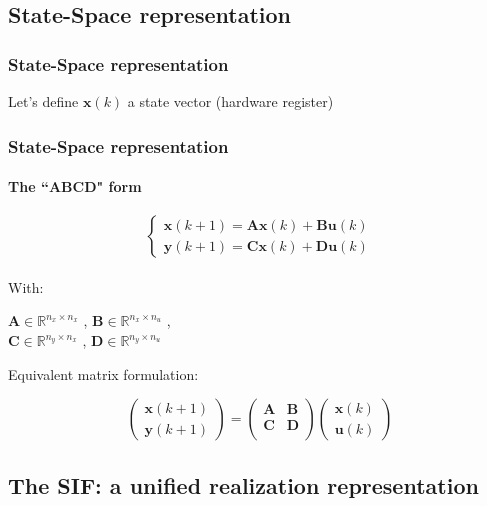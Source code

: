 \subsection{State-Space representation}
\begin{frame}
	\frametitle{State-Space representation}
	Let's define $\boldsymbol{x}(k)$ a state vector (hardware register)
	\frametitle{State-Space representation}
	\framesubtitle{The ``ABCD" form}
	\begin{equation} \label{abcddef}
		\begin{cases}
			\boldsymbol{x}(k+1)= \boldsymbol{Ax}(k) + \boldsymbol{Bu}(k) \\
			\boldsymbol{y}(k+1)= \boldsymbol{Cx}(k) + \boldsymbol{Du}(k)
		\end{cases}
	\end{equation}
	\\
	With: \\
		\begin{center}
	$\boldsymbol{A} \in \mathbb{R}^{n_x \times n_x}$ ,
	$\boldsymbol{B} \in \mathbb{R}^{n_x \times n_u}$ , \\
	$\boldsymbol{C} \in \mathbb{R}^{n_y \times n_x}$ ,
	$\boldsymbol{D} \in \mathbb{R}^{n_y \times n_u}$
		\end{center}

	Equivalent matrix formulation:
	
	\begin{equation} \label{abcdef}
		\begin{pmatrix}
			\boldsymbol{x} (k+1)  \\
			\boldsymbol{y} (k+1) 
		\end{pmatrix}
		=
		\begin{pmatrix}
			\boldsymbol{A} & \boldsymbol{B} \\
			\boldsymbol{C} & \boldsymbol{D} \\
		\end{pmatrix}
		\begin{pmatrix}
			\boldsymbol{x} (k)  \\
			\boldsymbol{u} (k) 
		\end{pmatrix}
	\end{equation}

\end{frame}





\subsection{The SIF: a unified realization representation }

